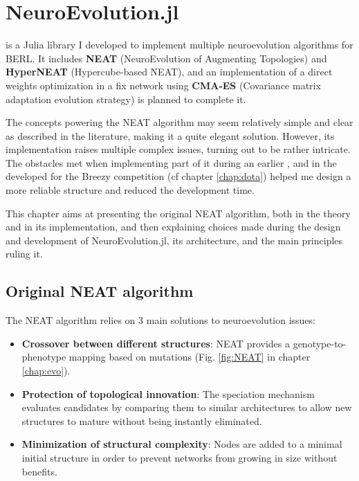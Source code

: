 \chapter{NeuroEvolution.jl}
\label{chap:neuroevo}

 is a Julia library I developed to implement multiple neuroevolution algorithms for BERL. It includes \textbf{NEAT} (NeuroEvolution of Augmenting Topologies) and \textbf{HyperNEAT} (Hypercube-based NEAT), and an implementation of a direct weights optimization in a fix network using \textbf{CMA-ES} (Covariance matrix adaptation evolution strategy) is planned to complete it. 

The concepts powering the NEAT algorithm may seem relatively simple and clear as described in the literature, making it a quite elegant solution. However, its implementation raises multiple complex issues, turning out to be rather intricate. The obstacles met when implementing part of it during an earlier ,  and in the  developed for the Breezy competition (cf chapter \ref{chap:dota}) helped me design a more reliable structure and reduced the development time.

This chapter aims at presenting the original NEAT algorithm, both in the theory and in its implementation, and then explaining choices made during the design and development of NeuroEvolution.jl, its architecture, and the main principles ruling it. 

\section{Original NEAT algorithm}
\label{sec:og-neat}

The NEAT algorithm relies on 3 main solutions to neuroevolution issues:
\begin{itemize}
    \item \textbf{Crossover between different structures}: NEAT provides a genotype-to-phenotype mapping based on mutations (Fig. \ref{fig:NEAT} in chapter \ref{chap:evo}).
    \item \textbf{Protection of topological innovation}: The speciation mechanism evaluates candidates by comparing them to similar architectures to allow new structures to mature without being instantly eliminated. 
    \item \textbf{Minimization of structural complexity}: Nodes are added to a minimal initial structure in order to prevent networks from growing in size without benefits.
\end{itemize}

